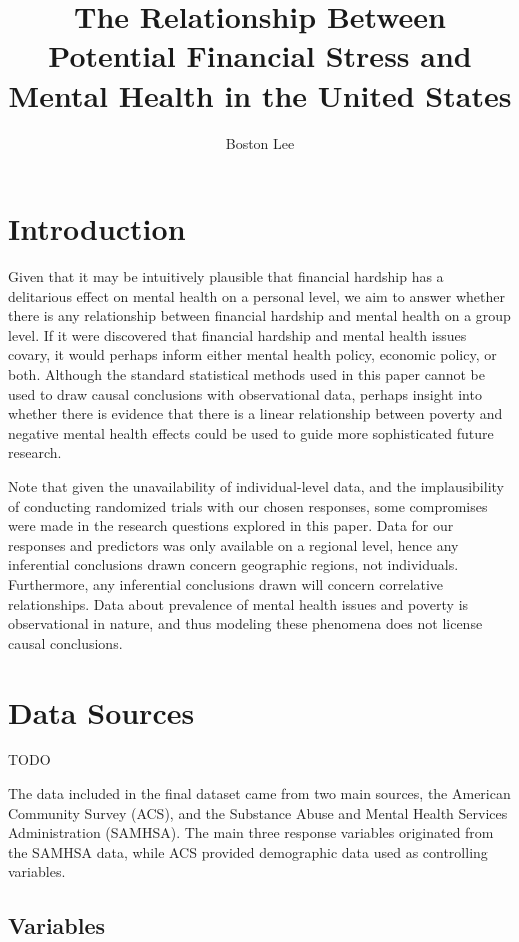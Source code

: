 \documentclass{article}
\title{The Relationship Between Potential Financial Stress and Mental Health in the United States}
\author{Boston Lee}
\begin{document}
\maketitle

\pagebreak

\section{Introduction}

Given that it may be intuitively plausible that financial hardship has a
delitarious effect on mental health on a personal level,
we aim to answer whether there is any relationship
between financial hardship and mental health on a group level.
If it were discovered that financial hardship and mental
health issues covary, it would perhaps inform
either mental health policy, economic policy, or both.
Although the standard statistical methods used in this paper
cannot be used to draw causal conclusions with observational data,
perhaps insight into whether there is evidence that there
is a linear relationship between poverty and negative mental health effects
could be used to guide more sophisticated future research.

Note that given the unavailability of individual-level data,
and the implausibility of conducting randomized trials with our chosen responses,
some compromises were made in the research questions explored in this paper.
Data for our responses and predictors was only available on a regional level,
hence any inferential conclusions drawn
concern geographic regions, not individuals.
Furthermore, any inferential conclusions drawn will concern correlative
relationships.
Data about prevalence of mental health issues and poverty is observational
in nature, and thus modeling these phenomena does not license causal
conclusions.

\section{Data Sources}

TODO

The data included in the final dataset came from two main sources, the American
Community Survey (ACS), and the Substance Abuse and Mental Health Services
Administration (SAMHSA). The main three response variables originated from the
SAMHSA data, while ACS provided demographic data used as controlling variables.

\subsection{Variables}\label{sec:finalvars}
\end{document}
